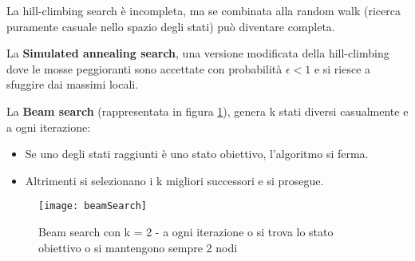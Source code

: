 La hill-climbing search è incompleta, ma se combinata alla random walk
(ricerca puramente casuale nello spazio degli stati) può diventare completa.

La \textbf{Simulated annealing search}, una versione modificata
della hill-climbing dove le mosse peggioranti sono accettate con probabilità
$\epsilon < 1$ e si riesce a sfuggire dai massimi locali.

La \textbf{Beam search} (rappresentata in figura \ref{fig:beamSearch}), genera
k stati diversi casualmente e a ogni iterazione:

\begin{itemize}
 \item Se uno degli stati raggiunti è uno stato obiettivo, l'algoritmo si ferma.
 \item Altrimenti si selezionano i k migliori successori e si prosegue.
\end{itemize}

\begin{figure}[H]
\centering
\texttt{[image: beamSearch]}
\caption{Beam search con k = 2 - a ogni iterazione o si trova lo stato obiettivo
o si mantengono sempre 2 nodi}
\label{fig:beamSearch}
\end{figure}
